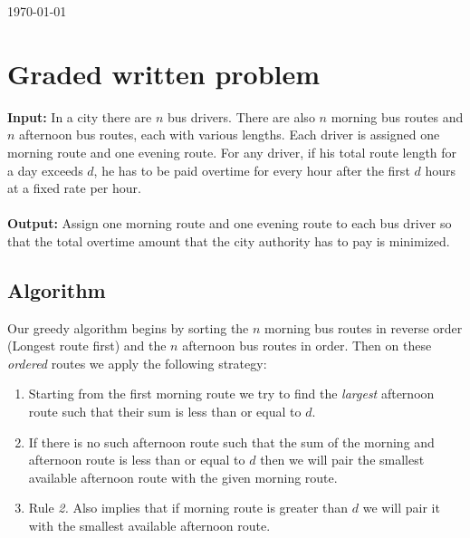 \documentclass[8pt]{article}
\begin{document}
\hfill \small{\today} \\
\setlength{\fboxrule}{.5mm}\setlength{\fboxsep}{1.2mm}
\newlength{\boxlength}\setlength{\boxlength}{\textwidth}
\addtolength{\boxlength}{-4mm}
\begin{center}\end{center}
\vspace{5mm}

\section{Graded written problem}

\textbf{Input:} In a city there are $n$ bus drivers. There are also $n$ morning bus routes and $n$ afternoon bus routes, each with various lengths. Each driver is assigned one morning route
and one evening route. For any driver, if his total route length for a day exceeds $d$, he has to
be paid overtime for every hour after the first $d$ hours at a fixed rate per hour.
\\ \\
\textbf{Output:} Assign one morning route and one evening route to each bus driver so that the total overtime amount that the city authority has to pay is minimized.

\subsection{Algorithm}
Our greedy algorithm begins by sorting the $n$ morning bus routes in reverse order (Longest route first) and the $n$ afternoon bus routes in order. Then on these \textit{ordered} routes we apply the following strategy:
\begin{enumerate}
    \item Starting from the first morning route we try to find the \textit{largest} afternoon route such that their sum is less than or equal to $d$. 
    \item If there is no such afternoon route such that the sum of the morning and afternoon route is less than or equal to $d$ then we will pair the smallest available afternoon route with the given morning route.
    \item Rule \textit{2.} Also implies that if morning route is greater than $d$ we will pair it with the smallest available afternoon route.
\end{enumerate}
\end{document}
